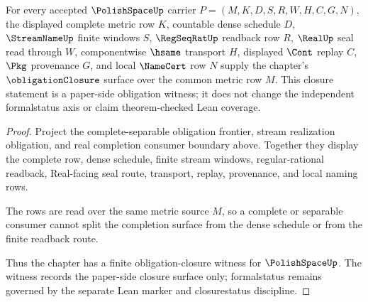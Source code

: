 \begin{theorem}
\label{thm:polishspace-obligation-closure-witness}
For every accepted $\PolishSpaceUp$ carrier $P=(M,K,D,S,R,W,H,C,G,N)$, the displayed complete metric row $K$, countable dense schedule $D$, $\StreamNameUp$ finite windows $S$, $\RegSeqRatUp$ readback row $R$, $\RealUp$ seal read through $W$, componentwise $\hsame$ transport $H$, displayed $\Cont$ replay $C$, $\Pkg$ provenance $G$, and local $\NameCert$ row $N$ supply the chapter's $\obligationClosure$ surface over the common metric row $M$. This closure statement is a paper-side obligation witness; it does not change the independent formalstatus axis or claim theorem-checked Lean coverage.
\end{theorem}
\begin{proof}
Project the complete-separable obligation frontier, stream realization obligation, and real completion consumer boundary above. Together they display the complete row, dense schedule, finite stream windows, regular-rational readback, Real-facing seal route, transport, replay, provenance, and local naming rows.

The rows are read over the same metric source $M$, so a complete or separable consumer cannot split the completion surface from the dense schedule or from the finite readback route.

Thus the chapter has a finite obligation-closure witness for $\PolishSpaceUp$. The witness records the paper-side closure surface only; formalstatus remains governed by the separate Lean marker and closurestatus discipline.
\end{proof}
